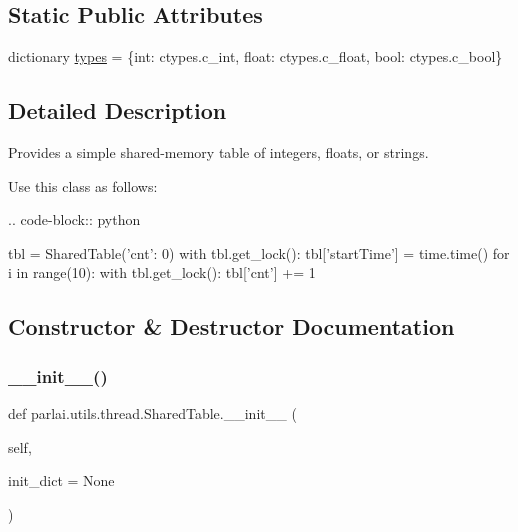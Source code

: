 \subsection*{Static Public Attributes}
\begin{DoxyCompactItemize}
\item 
dictionary \hyperlink{classparlai_1_1utils_1_1thread_1_1SharedTable_afe67b490096de733e17e35834a5b55f4}{types} = \{int\+: ctypes.\+c\+\_\+int, float\+: ctypes.\+c\+\_\+float, bool\+: ctypes.\+c\+\_\+bool\}
\end{DoxyCompactItemize}


\subsection{Detailed Description}
\begin{DoxyVerb}Provides a simple shared-memory table of integers, floats, or strings.

Use this class as follows:

.. code-block:: python

    tbl = SharedTable({'cnt': 0})
    with tbl.get_lock():
        tbl['startTime'] = time.time()
    for i in range(10):
        with tbl.get_lock():
            tbl['cnt'] += 1
\end{DoxyVerb}
 

\subsection{Constructor \& Destructor Documentation}
\mbox{\label{classparlai_1_1utils_1_1thread_1_1SharedTable_a52b58b8d6ad0ba31cf2e3236afe970a5}} 
\subsubsection{\texorpdfstring{\+\_\+\+\_\+init\+\_\+\+\_\+()}{\_\_init\_\_()}}
{\footnotesize\ttfamily def parlai.\+utils.\+thread.\+Shared\+Table.\+\_\+\+\_\+init\+\_\+\+\_\+ (\begin{DoxyParamCaption}\item[{}]{self,  }\item[{}]{init\+\_\+dict = {\ttfamily None} }\end{DoxyParamCaption})}


